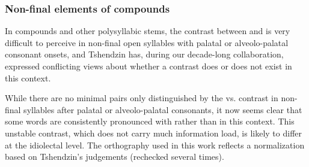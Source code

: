 \subsubsection{Non-final elements of compounds} \label{sec:W.i.compounds}
In compounds and other polysyllabic stems, the contrast between  and  is very difficult to perceive in non-final open syllables with palatal or alveolo-palatal consonant onsets, and Tshendzin has, during our decade-long collaboration, expressed conflicting views about whether a contrast does or does not exist in this context.

While there are no minimal pairs only distinguished by the  vs.  contrast in non-final syllables after palatal or alveolo-palatal consonants, it now seems clear that some words are consistently pronounced with  rather than  in this context. This unstable contrast, which does not carry much information load, is likely to differ at the idiolectal level. The orthography used in this work reflects a normalization based on Tshendzin's judgements (rechecked several times).

